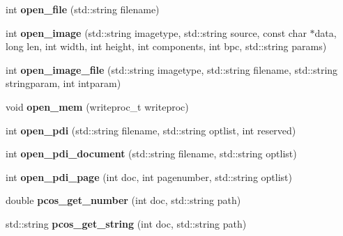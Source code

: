 \begin{DoxyCompactItemize}
\item 
\hypertarget{classPDFlib_ad3b48373b17c17a9e8b491ef1da40bdf}{int {\bfseries open\-\_\-file} (std\-::string filename)}\label{classPDFlib_ad3b48373b17c17a9e8b491ef1da40bdf}

\item 
\hypertarget{classPDFlib_aaf45ace35fe6f1b149f4f8d729dbd612}{int {\bfseries open\-\_\-image} (std\-::string imagetype, std\-::string source, const char $\ast$data, long len, int width, int height, int components, int bpc, std\-::string params)}\label{classPDFlib_aaf45ace35fe6f1b149f4f8d729dbd612}

\item 
\hypertarget{classPDFlib_a11741eafa900b4490097cb913709b984}{int {\bfseries open\-\_\-image\-\_\-file} (std\-::string imagetype, std\-::string filename, std\-::string stringparam, int intparam)}\label{classPDFlib_a11741eafa900b4490097cb913709b984}

\item 
\hypertarget{classPDFlib_a2ec7cc181d64f7baa8d08e74f2824ab8}{void {\bfseries open\-\_\-mem} (writeproc\-\_\-t writeproc)}\label{classPDFlib_a2ec7cc181d64f7baa8d08e74f2824ab8}

\item 
\hypertarget{classPDFlib_a13d36d30ea9a98394589977fe877ae47}{int {\bfseries open\-\_\-pdi} (std\-::string filename, std\-::string optlist, int reserved)}\label{classPDFlib_a13d36d30ea9a98394589977fe877ae47}

\item 
\hypertarget{classPDFlib_a0d18c17852e877905ab0310ecf1e0b37}{int {\bfseries open\-\_\-pdi\-\_\-document} (std\-::string filename, std\-::string optlist)}\label{classPDFlib_a0d18c17852e877905ab0310ecf1e0b37}

\item 
\hypertarget{classPDFlib_ae1e065f5dcb8e50aad847deca22b8841}{int {\bfseries open\-\_\-pdi\-\_\-page} (int doc, int pagenumber, std\-::string optlist)}\label{classPDFlib_ae1e065f5dcb8e50aad847deca22b8841}

\item 
\hypertarget{classPDFlib_a639288411ee0b9e98ffbdb34434f05ed}{double {\bfseries pcos\-\_\-get\-\_\-number} (int doc, std\-::string path)}\label{classPDFlib_a639288411ee0b9e98ffbdb34434f05ed}

\item 
\hypertarget{classPDFlib_a47f5ff4cc553f72a50c7fc3e25aae4aa}{std\-::string {\bfseries pcos\-\_\-get\-\_\-string} (int doc, std\-::string path)}\label{classPDFlib_a47f5ff4cc553f72a50c7fc3e25aae4aa}


\end{DoxyCompactItemize}
